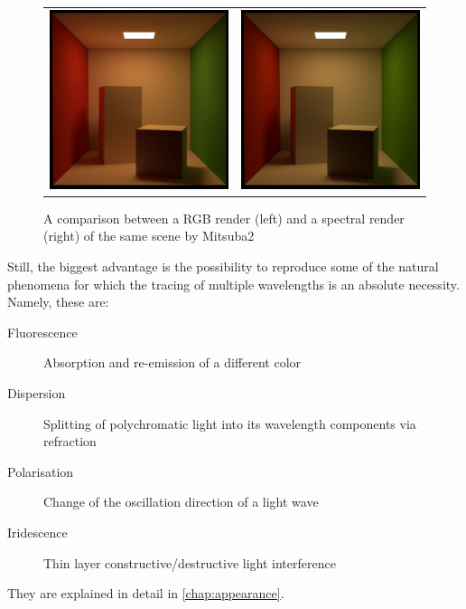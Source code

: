 \begin{figure}[httpb]
	\begin{tabular}{cc}
		\includegraphics[width=.45\linewidth]{img/rgb.jpg}
		&
		\includegraphics[width=.45\linewidth]{img/spectral.jpg}
	\end{tabular}
	\caption{A comparison between a RGB render (left) and a spectral render (right) of the same scene by Mitsuba2~\cite{mitsubaWeb}}
	\label{fig:compare_color}
\end{figure}

Still, the biggest advantage is the possibility to reproduce some of the natural phenomena for which the tracing of multiple wavelengths is an absolute necessity. Namely, these are:
\begin{description}
	\item[Fluorescence] Absorption and re-emission of a different color
	\item[Dispersion] Splitting of polychromatic light into its wavelength components via refraction
	\item[Polarisation] Change of the oscillation direction of a light wave 
	\item[Iridescence] Thin layer constructive/destructive light interference
\end{description}
They are explained in detail in \autoref{chap:appearance}.

